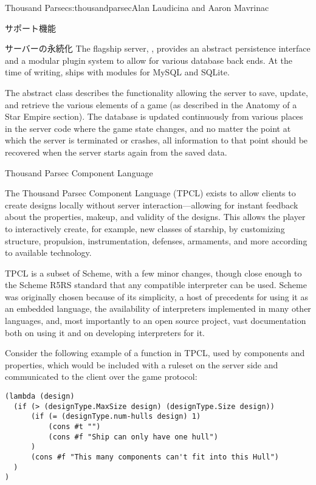 \begin{aosachapter}{Thousand Parsec}{s:thousandparsec}{Alan Laudicina and Aaron Mavrinac}
\begin{aosasect1}{サポート機能}
\begin{aosasect2}{サーバーの永続化}
The flagship server, , provides an abstract
persistence interface and a modular plugin system to allow for various
database back ends. At the time of writing,  ships
with modules for MySQL and SQLite.

The abstract  class describes the functionality
allowing the server to save, update, and retrieve the various elements
of a game (as described in the Anatomy of a Star Empire section). The
database is updated continuously from various places in the server
code where the game state changes, and no matter the point at which
the server is terminated or crashes, all information to that point
should be recovered when the server starts again from the saved data.

\end{aosasect2}

\begin{aosasect2}{Thousand Parsec Component Language}

The Thousand Parsec Component Language (TPCL) exists to allow clients
to create designs locally without server interaction---allowing for
instant feedback about the properties, makeup, and validity of the
designs. This allows the player to interactively create, for example,
new classes of starship, by customizing structure, propulsion,
instrumentation, defenses, armaments, and more according to available
technology.

TPCL is a subset of Scheme, with a few minor changes, though close
enough to the Scheme R5RS standard that any compatible interpreter can
be used. Scheme was originally chosen because of its simplicity, a
host of precedents for using it as an embedded language, the
availability of interpreters implemented in many other languages, and,
most importantly to an open source project, vast documentation both on
using it and on developing interpreters for it.

Consider the following example of a  function in
TPCL, used by components and properties, which would be included with
a ruleset on the server side and communicated to the client over the
game protocol:

\begin{verbatim}
(lambda (design)
  (if (> (designType.MaxSize design) (designType.Size design))
      (if (= (designType.num-hulls design) 1)
          (cons #t "")
          (cons #f "Ship can only have one hull")
      )
      (cons #f "This many components can't fit into this Hull")
  )
)
\end{verbatim}


\end{aosasect2}
\end{aosasect1}
\end{aosachapter}
